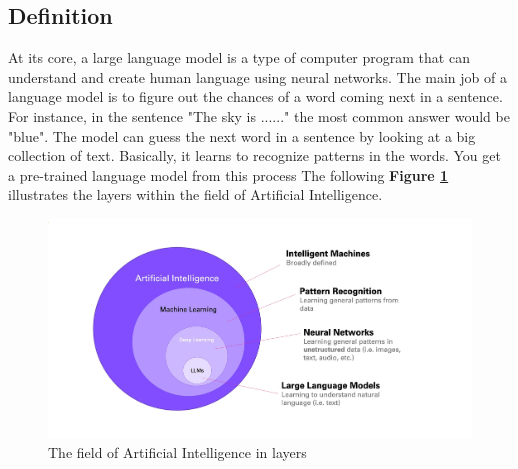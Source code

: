 \subsection{Definition}
At its core, a large language model is a type of computer program that can understand and create human language using neural networks. The main job of a language model is to figure out the chances of a word coming next in a sentence. For instance, in the sentence "The sky is ......" the most common answer would be "blue". The model can guess the next word in a sentence by looking at a big collection of text. Basically, it learns to recognize patterns in the words. You get a pre-trained language model from this process
\vskip 0.5cm
The following \textbf{Figure \ref{fig:artificial-intelligence}} \cite{w9} illustrates the layers within the field of Artificial Intelligence.
\begin{figure}[H]
    \label{fig:artificial-intelligence}
    \centering
    \includegraphics[width=0.83 \linewidth]{assets/art.png}
    \caption{The field of Artificial Intelligence in layers}
\end{figure}

